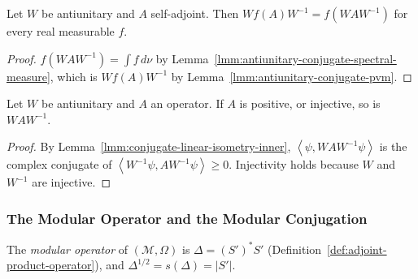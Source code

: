 \begin{corollary}
    \label{crllr:antiunitary-conjugate-functional-calculus}
    \leanok
    Let $W$ be antiunitary and $A$ self-adjoint. Then $Wf(A)W^{-1} = f(WAW^{-1})$ for every real measurable $f$.
\end{corollary}
\begin{proof}
    \leanok
    $f(WAW^{-1}) = \int f \, d\nu$ by Lemma~\ref{lmm:antiunitary-conjugate-spectral-measure}, which is $Wf(A)W^{-1}$ by Lemma~\ref{lmm:antiunitary-conjugate-pvm}.
\end{proof}

\begin{lemma}
    \label{lmm:antiunitary-conjugate-positive}
    \leanok
    Let $W$ be antiunitary and $A$ an operator. If $A$ is positive, or injective, so is $WAW^{-1}$.
\end{lemma}
\begin{proof}
    \leanok
    By Lemma~\ref{lmm:conjugate-linear-isometry-inner}, $\left< \psi, WAW^{-1}\psi \right>$ is the complex conjugate of $\left< W^{-1}\psi, AW^{-1}\psi \right> \ge 0$. Injectivity holds because $W$ and $W^{-1}$ are injective.
\end{proof}

\subsubsection{The Modular Operator and the Modular Conjugation}

\begin{definition}
    \label{def:modular-operator}
    \leanok
    The \emph{modular operator} of $(\mathcal{M}, \Omega)$ is $\Delta = (S')^*S'$ (Definition~\ref{def:adjoint-product-operator}), and $\Delta^{1/2} = s(\Delta) = |S'|$.
\end{definition}

